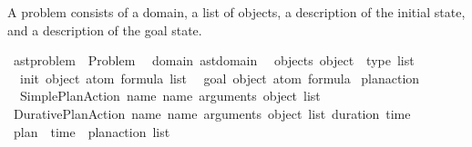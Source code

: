 \begin{isabellebody}
\begin{isamarkuptext}%
A problem consists of a domain, a list of objects,
  a description of the initial state, and a description of the goal state.%
\end{isamarkuptext}\isamarkuptrue%
\isamarkupfalse%
\ ast{\isacharunderscore}{\kern0pt}problem\ {\isacharequal}{\kern0pt}\ Problem\isanewline
\ \ {\isacharparenleft}{\kern0pt}domain{\isacharcolon}{\kern0pt}\ ast{\isacharunderscore}{\kern0pt}domain{\isacharparenright}{\kern0pt}\isanewline
\ \ {\isacharparenleft}{\kern0pt}objects{\isacharcolon}{\kern0pt}\ {\isachardoublequoteopen}{\isacharparenleft}{\kern0pt}object\ {\isasymtimes}\ type{\isacharparenright}{\kern0pt}\ list{\isachardoublequoteclose}{\isacharparenright}{\kern0pt}\isanewline
\ \ {\isacharparenleft}{\kern0pt}init{\isacharcolon}{\kern0pt}\ {\isachardoublequoteopen}object\ atom\ formula\ list{\isachardoublequoteclose}{\isacharparenright}{\kern0pt}\isanewline
\ \ {\isacharparenleft}{\kern0pt}goal{\isacharcolon}{\kern0pt}\ {\isachardoublequoteopen}object\ atom\ formula{\isachardoublequoteclose}{\isacharparenright}{\kern0pt}%
\isadelimdocument
%
\endisadelimdocument
%
\isatagdocument
%
\isamarkuptrue%
%
\endisatagdocument
{\isafolddocument}%
%
\isadelimdocument
%
\endisadelimdocument
{}\isamarkupfalse%
\ plan{\isacharunderscore}{\kern0pt}action\ {\isacharequal}{\kern0pt}\ \isanewline
\ \ Simple{\isacharunderscore}{\kern0pt}Plan{\isacharunderscore}{\kern0pt}Action\ {\isacharparenleft}{\kern0pt}name{\isacharcolon}{\kern0pt}\ name{\isacharparenright}{\kern0pt}\ {\isacharparenleft}{\kern0pt}arguments{\isacharcolon}{\kern0pt}\ {\isachardoublequoteopen}object\ list{\isachardoublequoteclose}{\isacharparenright}{\kern0pt}\isanewline
{\isacharbar}{\kern0pt}\ Durative{\isacharunderscore}{\kern0pt}Plan{\isacharunderscore}{\kern0pt}Action\ {\isacharparenleft}{\kern0pt}name{\isacharcolon}{\kern0pt}\ name{\isacharparenright}{\kern0pt}\ {\isacharparenleft}{\kern0pt}arguments{\isacharcolon}{\kern0pt}\ {\isachardoublequoteopen}object\ list{\isachardoublequoteclose}{\isacharparenright}{\kern0pt}\ {\isacharparenleft}{\kern0pt}duration{\isacharcolon}{\kern0pt}\ time{\isacharparenright}{\kern0pt}\isanewline
\isanewline
{}\isamarkupfalse%
\ plan\ {\isacharequal}{\kern0pt}\ {\isachardoublequoteopen}{\isacharparenleft}{\kern0pt}time\ {\isasymtimes}\ plan{\isacharunderscore}{\kern0pt}action{\isacharparenright}{\kern0pt}\ list{\isachardoublequoteclose}%
\isadelimdocument

\end{isabellebody}
